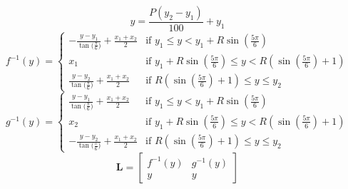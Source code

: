 		\begin{equation}
		\label{eq:hexagon_ratio}
			y = \frac{P(y_2-y_1)}{100} + y_1
		\end{equation}
		\begin{equation}
		\label{eq:hexagon_left_intersection}
			f^{-1}(y) =
			\begin{cases} 
				-\frac{y - y_1}{\tan{(\frac{\pi}{6}})} + \frac{x_1 + x_2}{2} & \text{if } y_1 \le y < y_1 + R\sin{(\frac{5\pi}{6})} \\
				x_1 & \text{if } y_1 + R\sin{(\frac{5\pi}{6})} \le y < R(\sin{(\frac{5\pi}{6})} + 1) \\
				\frac{y - y_2}{\tan{(\frac{\pi}{6}})} + \frac{x_1 + x_2}{2} & \text{if } R(\sin{(\frac{5\pi}{6})} + 1) \le y \le y_2
			\end{cases}
		\end{equation}
		\begin{equation}
		\label{eq:hexagon_right_intersection}
			g^{-1}(y) = 
			\begin{cases} 
				\frac{y - y_1}{\tan{(\frac{\pi}{6}})} + \frac{x_1 + x_2}{2} & \text{if } y_1 \le y < y_1 + R\sin{(\frac{5\pi}{6})} \\
				x_2 & \text{if } y_1 + R\sin{(\frac{5\pi}{6})} \le y < R(\sin{(\frac{5\pi}{6})} + 1) \\
				-\frac{y - y_2}{\tan{(\frac{\pi}{6}})} + \frac{x_1 + x_2}{2} & \text{if } R(\sin{(\frac{5\pi}{6})} + 1) \le y \le y_2
			\end{cases}
		\end{equation}
		\begin{equation}
		\label{eq:hexagon_split_line}
			\mathbf{L} =
			\begin{bmatrix}
				f^{-1}(y) & g^{-1}(y) \\
				y & y
			\end{bmatrix}
		\end{equation}
